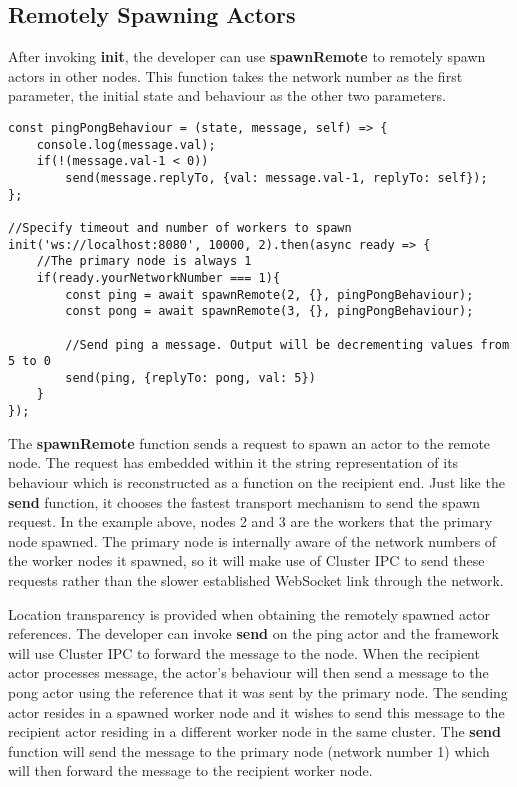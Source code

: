 \documentclass[12pt, a4paper]{report}
\theoremstyle{definition}
\theoremstyle{definition}%
\theoremstyle{definition}%
\theoremstyle{definition}%
\theoremstyle{definition}%
\theoremstyle{definition}%
\begin{document}
\subsection{Remotely Spawning Actors}
After invoking \textbf{init}, the developer can use \textbf{spawnRemote} to remotely spawn actors in other nodes. This function takes the network number as the first parameter, the initial state and behaviour as the other two parameters.
\begin{lstlisting}
const pingPongBehaviour = (state, message, self) => {
    console.log(message.val);
    if(!(message.val-1 < 0))
        send(message.replyTo, {val: message.val-1, replyTo: self});
};

//Specify timeout and number of workers to spawn
init('ws://localhost:8080', 10000, 2).then(async ready => {
    //The primary node is always 1
    if(ready.yourNetworkNumber === 1){
        const ping = await spawnRemote(2, {}, pingPongBehaviour);
        const pong = await spawnRemote(3, {}, pingPongBehaviour);

        //Send ping a message. Output will be decrementing values from 5 to 0
        send(ping, {replyTo: pong, val: 5})
    }
});
\end{lstlisting}
The \textbf{spawnRemote} function sends a request to spawn an actor to the remote node. The request has embedded within it the string representation of its behaviour which is reconstructed as a function on the recipient end. Just like the \textbf{send} function, it chooses the fastest transport mechanism to send the spawn request. In the example above, nodes 2 and 3 are the workers that the primary node spawned. The primary node is internally aware of the network numbers of the worker nodes it spawned, so it will make use of Cluster IPC to send these requests rather than the slower established WebSocket link through the network.

Location transparency is provided when obtaining the remotely spawned actor references. The developer can invoke \textbf{send} on the ping actor and the framework will use Cluster IPC to forward the message to the node. When the recipient actor processes message, the actor's behaviour will then send a message to the pong actor using the reference that it was sent by the primary node. The sending actor resides in a spawned worker node and it wishes to send this message to the recipient actor residing in a different worker node in the same cluster. The \textbf{send} function will send the message to the primary node (network number 1) which will then forward the message to the recipient worker node.
\end{document}
